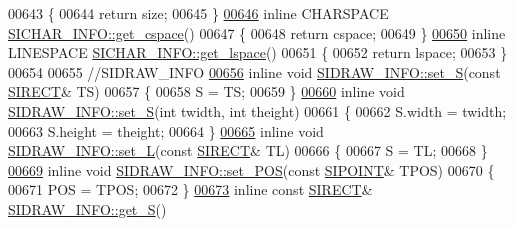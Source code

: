 \begin{DoxyCode}
00643 \{
00644     \textcolor{keywordflow}{return} size;
00645 \}
\hyperlink{class_s_i_c_h_a_r___i_n_f_o_af170e524f63209016d06f919dd4c33d3}{00646} \textcolor{keyword}{inline} CHARSPACE \hyperlink{class_s_i_c_h_a_r___i_n_f_o_af170e524f63209016d06f919dd4c33d3}{SICHAR\_INFO::get\_cspace}()
00647 \{
00648     \textcolor{keywordflow}{return} cspace;
00649 \}
\hyperlink{class_s_i_c_h_a_r___i_n_f_o_a212cea0692a8717d5b671035885796c2}{00650} \textcolor{keyword}{inline} LINESPACE \hyperlink{class_s_i_c_h_a_r___i_n_f_o_a212cea0692a8717d5b671035885796c2}{SICHAR\_INFO::get\_lspace}()
00651 \{
00652     \textcolor{keywordflow}{return} lspace;
00653 \}
00654 
00655 \textcolor{comment}{//SIDRAW\_INFO}
\hyperlink{class_s_i_d_r_a_w___i_n_f_o_aa4c9bdd6f914bc65d2900a9e6b5fa46e}{00656} \textcolor{keyword}{inline} \textcolor{keywordtype}{void} \hyperlink{class_s_i_d_r_a_w___i_n_f_o_aa4c9bdd6f914bc65d2900a9e6b5fa46e}{SIDRAW\_INFO::set\_S}(\textcolor{keyword}{const} \hyperlink{struct_s_i_r_e_c_t}{SIRECT}& TS)
00657 \{
00658     S = TS;
00659 \}
\hyperlink{class_s_i_d_r_a_w___i_n_f_o_ae3f97d9ad0701d3efe0bcda63b02c021}{00660} \textcolor{keyword}{inline} \textcolor{keywordtype}{void} \hyperlink{class_s_i_d_r_a_w___i_n_f_o_aa4c9bdd6f914bc65d2900a9e6b5fa46e}{SIDRAW\_INFO::set\_S}(\textcolor{keywordtype}{int} twidth, \textcolor{keywordtype}{int} theight)
00661 \{
00662     S.width = twidth;
00663     S.height = theight;
00664 \}
\hyperlink{class_s_i_d_r_a_w___i_n_f_o_ae70aee6b53f6bb4f52e8c70ea6094565}{00665} \textcolor{keyword}{inline} \textcolor{keywordtype}{void} \hyperlink{class_s_i_d_r_a_w___i_n_f_o_ae70aee6b53f6bb4f52e8c70ea6094565}{SIDRAW\_INFO::set\_L}(\textcolor{keyword}{const} \hyperlink{struct_s_i_r_e_c_t}{SIRECT}& TL)
00666 \{
00667     S = TL;
00668 \}
\hyperlink{class_s_i_d_r_a_w___i_n_f_o_a6fb070443ef25d1de07bb98954df00a6}{00669} \textcolor{keyword}{inline} \textcolor{keywordtype}{void} \hyperlink{class_s_i_d_r_a_w___i_n_f_o_a6fb070443ef25d1de07bb98954df00a6}{SIDRAW\_INFO::set\_POS}(\textcolor{keyword}{const} \hyperlink{struct_s_i_p_o_i_n_t}{SIPOINT}& TPOS)
00670 \{
00671     POS = TPOS;
00672 \}
\hyperlink{class_s_i_d_r_a_w___i_n_f_o_abb39527ef4c718afe5c78692fc24f12c}{00673} \textcolor{keyword}{inline} \textcolor{keyword}{const} \hyperlink{struct_s_i_r_e_c_t}{SIRECT}& \hyperlink{class_s_i_d_r_a_w___i_n_f_o_abb39527ef4c718afe5c78692fc24f12c}{SIDRAW\_INFO::get\_S}()

\end{DoxyCode}
